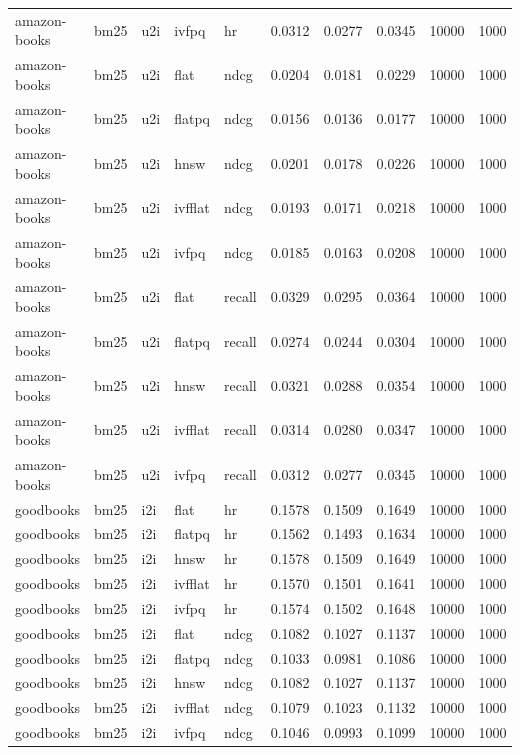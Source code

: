 \begin{tabular}{lllllrrrrr}
amazon-books & bm25 & u2i & ivfpq & hr & 0.0312 & 0.0277 & 0.0345 & 10000 & 1000 \\
amazon-books & bm25 & u2i & flat & ndcg & 0.0204 & 0.0181 & 0.0229 & 10000 & 1000 \\
amazon-books & bm25 & u2i & flatpq & ndcg & 0.0156 & 0.0136 & 0.0177 & 10000 & 1000 \\
amazon-books & bm25 & u2i & hnsw & ndcg & 0.0201 & 0.0178 & 0.0226 & 10000 & 1000 \\
amazon-books & bm25 & u2i & ivfflat & ndcg & 0.0193 & 0.0171 & 0.0218 & 10000 & 1000 \\
amazon-books & bm25 & u2i & ivfpq & ndcg & 0.0185 & 0.0163 & 0.0208 & 10000 & 1000 \\
amazon-books & bm25 & u2i & flat & recall & 0.0329 & 0.0295 & 0.0364 & 10000 & 1000 \\
amazon-books & bm25 & u2i & flatpq & recall & 0.0274 & 0.0244 & 0.0304 & 10000 & 1000 \\
amazon-books & bm25 & u2i & hnsw & recall & 0.0321 & 0.0288 & 0.0354 & 10000 & 1000 \\
amazon-books & bm25 & u2i & ivfflat & recall & 0.0314 & 0.0280 & 0.0347 & 10000 & 1000 \\
amazon-books & bm25 & u2i & ivfpq & recall & 0.0312 & 0.0277 & 0.0345 & 10000 & 1000 \\
goodbooks & bm25 & i2i & flat & hr & 0.1578 & 0.1509 & 0.1649 & 10000 & 1000 \\
goodbooks & bm25 & i2i & flatpq & hr & 0.1562 & 0.1493 & 0.1634 & 10000 & 1000 \\
goodbooks & bm25 & i2i & hnsw & hr & 0.1578 & 0.1509 & 0.1649 & 10000 & 1000 \\
goodbooks & bm25 & i2i & ivfflat & hr & 0.1570 & 0.1501 & 0.1641 & 10000 & 1000 \\
goodbooks & bm25 & i2i & ivfpq & hr & 0.1574 & 0.1502 & 0.1648 & 10000 & 1000 \\
goodbooks & bm25 & i2i & flat & ndcg & 0.1082 & 0.1027 & 0.1137 & 10000 & 1000 \\
goodbooks & bm25 & i2i & flatpq & ndcg & 0.1033 & 0.0981 & 0.1086 & 10000 & 1000 \\
goodbooks & bm25 & i2i & hnsw & ndcg & 0.1082 & 0.1027 & 0.1137 & 10000 & 1000 \\
goodbooks & bm25 & i2i & ivfflat & ndcg & 0.1079 & 0.1023 & 0.1132 & 10000 & 1000 \\
goodbooks & bm25 & i2i & ivfpq & ndcg & 0.1046 & 0.0993 & 0.1099 & 10000 & 1000 \\

\end{tabular}
